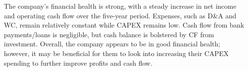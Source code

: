 

The company's financial health is strong, with a steady increase in net income and operating cash flow over the five-year period. Expenses, such as D&A and WC, remain relatively constant while CAPEX remains low. Cash flow from bank payments/loans is negligible, but cash balance is bolstered by CF from investment. Overall, the company appears to be in good financial health; however, it may be beneficial for them to look into increasing their CAPEX spending to further improve profits and cash flow.